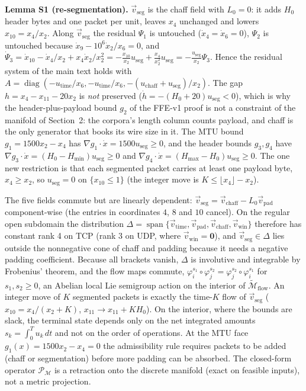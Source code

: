 \noindent\textbf{Lemma S1 (re-segmentation).} $\vec v_{\text{seg}}$ is the chaff field with $L_0=0$: it adds $H_0$ header bytes and one packet per unit, leaves $x_4$ unchanged and lowers $x_{10}=x_4/x_2$. Along $\vec v_{\text{seg}}$ the residual $\Psi_1$ is untouched ($\dot x_4=\dot x_6=0$), $\Psi_2$ is untouched because $\dot x_9-10^6\dot x_2/x_6=0$, and $\dot\Psi_3=\dot x_{10}-\dot x_4/x_2+x_4\dot x_2/x_2^2=-\tfrac{x_{10}}{x_2}u_{\text{seg}}+\tfrac{x_4}{x_2^2}u_{\text{seg}}=-\tfrac{u_{\text{seg}}}{x_2}\Psi_3$. Hence the residual system of the main text holds with $A=\operatorname{diag}(-u_{\text{time}}/x_6,-u_{\text{time}}/x_6,-(u_{\text{chaff}}+u_{\text{seg}})/x_2)$. The gap $h=x_4-x_{11}-20x_2$ is \emph{not} preserved ($\dot h=-(H_0+20)u_{\text{seg}}<0$), which is why the header-plus-payload bound $g_2$ of the FFE-v1 proof is not a constraint of the manifold of Section~2: the corpora's length column counts payload, and chaff is the only generator that books its wire size in it. The MTU bound $g_1=1500x_2-x_4$ has $\nabla g_1\cdot\dot x=1500u_{\text{seg}}\ge0$, and the header bounds $g_3,g_4$ have $\nabla g_3\cdot\dot x=(H_0-H_{\min})u_{\text{seg}}\ge0$ and $\nabla g_4\cdot\dot x=(H_{\max}-H_0)u_{\text{seg}}\ge0$. The one new restriction is that each segmented packet carries at least one payload byte, $x_4\ge x_2$, so $u_{\text{seg}}=0$ on $\{x_{10}\le1\}$ (the integer move is $K\le\lfloor x_4\rfloor-x_2$).

\begin{corollary}
The five fields commute but are linearly dependent: $\vec v_{\text{seg}}=\vec v_{\text{chaff}}-L_0\vec v_{\text{pad}}$ component-wise (the entries in coordinates $4$, $8$ and $10$ cancel). On the regular open subdomain the distribution $\Delta=\operatorname{span}\{\vec v_{\text{time}},\vec v_{\text{pad}},\vec v_{\text{chaff}},\vec v_{\text{win}}\}$ therefore has constant rank 4 on TCP (rank 3 on UDP, where $\vec v_{\text{win}}=\mathbf 0$), and $\vec v_{\text{seg}}\in\Delta$ lies outside the nonnegative cone of chaff and padding because it needs a negative padding coefficient. Because all brackets vanish, $\Delta$ is involutive and integrable by Frobenius' theorem, and the flow maps commute, $\varphi_i^{s_1}\circ\varphi_j^{s_2}=\varphi_j^{s_2}\circ\varphi_i^{s_1}$ for $s_1,s_2\ge0$, an Abelian local Lie semigroup action on the interior of $\widetilde{\mathcal M}_{\text{flow}}$. An integer move of $K$ segmented packets is exactly the time-$K$ flow of $\vec v_{\text{seg}}$ ($x_{10}=x_4/(x_2+K)$, $x_{11}\to x_{11}+KH_0$). On the interior, where the bounds are slack, the terminal state depends only on the net integrated amounts $s_k=\int_0^Tu_k\,dt$ and not on the order of operations. At the MTU face $g_1(x)=1500x_2-x_4=0$ the admissibility rule requires packets to be added (chaff or segmentation) before more padding can be absorbed. The closed-form operator $\mathcal P_{\mathcal M}$ is a retraction onto the discrete manifold (exact on feasible inputs), not a metric projection.
\end{corollary}

